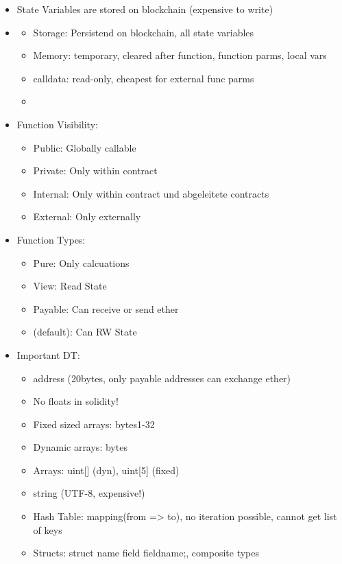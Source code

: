 \documentclass[../Main.tex]{subfiles}
\begin{document}
\begin{itemize}
    \item State Variables are stored on blockchain (expensive to write)
    \item \begin{itemize}
        \item Storage: Persistend on blockchain, all state variables
        \item Memory: temporary, cleared after function, function parms, local vars
        \item calldata: read-only, cheapest for external func parms
        \item 
    \end{itemize}
    \item Function Visibility:
    \begin{itemize}
        \item Public: Globally callable
        \item Private: Only within contract
        \item Internal: Only within contract und abgeleitete contracts
        \item External: Only externally
    \end{itemize}
    \item Function Types:
    \begin{itemize}
        \item Pure: Only calcuations
        \item View: Read State
        \item Payable: Can receive or send ether
        \item (default): Can RW State
    \end{itemize}
    \item Important DT:
    \begin{itemize}
        \item address (20bytes, only payable addresses can exchange ether)
        \item No floats in solidity!
        \item Fixed sized arrays: bytes1-32
        \item Dynamic arrays: bytes
        \item Arrays: uint[] (dyn), uint[5] (fixed)
        \item string (UTF-8, expensive!)
        \item Hash Table: mapping(from => to), no iteration possible, cannot get list of keys
        \item Structs: struct name {field fieldname;}, composite types

\end{itemize}
\end{itemize}
\end{document}
